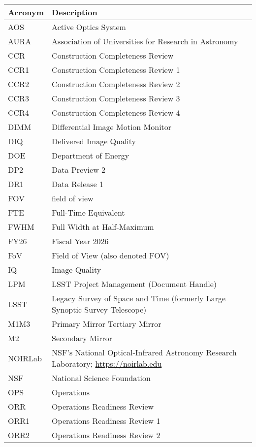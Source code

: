 \addtocounter{table}{-1}
\begin{longtable}{p{}p{}}\hline
\textbf{Acronym} & \textbf{Description}  \\\hline

AOS & Active Optics System \\\hline
AURA & Association of Universities for Research in Astronomy \\\hline
CCR & Construction Completeness Review \\\hline
CCR1 & Construction Completeness Review 1 \\\hline
CCR2 & Construction Completeness Review 2 \\\hline
CCR3 & Construction Completeness Review 3 \\\hline
CCR4 & Construction Completeness Review 4 \\\hline
DIMM & Differential Image Motion Monitor \\\hline
DIQ & Delivered Image Quality \\\hline
DOE & Department of Energy \\\hline
DP2 & Data Preview 2 \\\hline
DR1 & Data Release 1 \\\hline
FOV & field of view \\\hline
FTE & Full-Time Equivalent \\\hline
FWHM & Full Width at Half-Maximum \\\hline
FY26 & Fiscal Year 2026 \\\hline
FoV & Field of View (also denoted FOV) \\\hline
IQ & Image Quality \\\hline
LPM & LSST Project Management (Document Handle) \\\hline
LSST & Legacy Survey of Space and Time (formerly Large Synoptic Survey Telescope) \\\hline
M1M3 & Primary Mirror Tertiary Mirror \\\hline
M2 & Secondary Mirror \\\hline
NOIRLab & NSF's National Optical-Infrared Astronomy Research Laboratory; \url{https://noirlab.edu} \\\hline
NSF & National Science Foundation \\\hline
OPS & Operations \\\hline
ORR & Operations Readiness Review \\\hline
ORR1 & Operations Readiness Review 1 \\\hline
ORR2 & Operations Readiness Review 2 \\\hline

\end{longtable}
